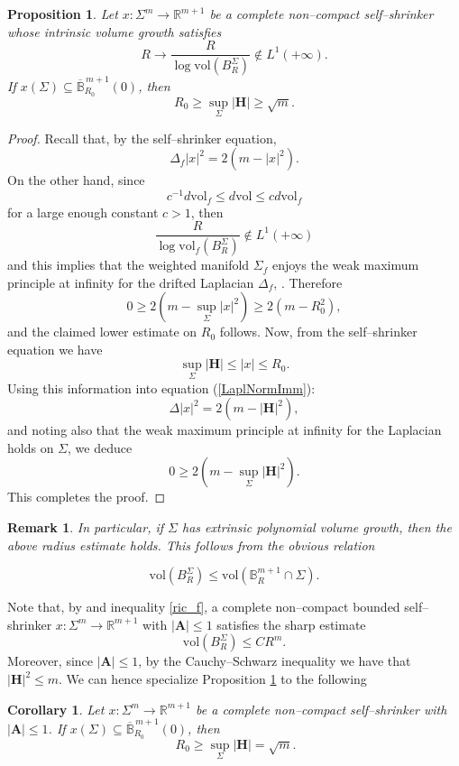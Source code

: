 \documentclass[11pt,leqno]{amsart}\usepackage{amsmath}
\newtheorem{corollary}[theorem]{Corollary}
\newtheorem{proposition}[theorem]{Proposition}
\newtheorem{remark}[theorem]{Remark}
\numberwithin{equation}{section}
\begin{document}
\begin{proposition}\label{PropBall}
Let $x\colon \Sigma^{m}\rightarrow\mathbb{R}^{m+1}$ be a complete non--compact self--shrinker
whose intrinsic volume growth satisfies
\[
R \to \frac{R}{\log\mathrm{vol}\left(B_{R}^{\Sigma}\right)} \not\in L^1(+\infty).
\]
If $x\left(  \Sigma\right)
\subseteq\overline{\mathbb{B}}_{R_{0}}^{\,m+1}\left(  0\right)$,
then\[
R_{0}\geq\sup_{\Sigma}\left\vert \mathbf{H}\right\vert \geq\sqrt{m}.
\]

\end{proposition}

\begin{proof}
Recall that, by the self--shrinker equation,\[
\Delta_{f}|x| ^{2}=2\left(  m-|x|^{2}\right)  .
\]
On the other hand, since
\[
c^{-1}d\mathrm{vol}_{f}\leq d\mathrm{vol}\leq cd\mathrm{vol}_{f}\]
for a large enough constant $c>1$, then
\[
\frac{R}{\log\mathrm{vol}_{f}\left(  B_{R}^{\Sigma}\right)} \not\in L^1(+\infty)
\]
and this implies that the weighted manifold $\Sigma_{f}$ enjoys the weak
maximum principle at infinity for the drifted Laplacian $\Delta_{f}$, \cite{PiRiSe-Memeoirs, PiRimSe-MathZ}.
Therefore\[
0\geq2\left(  m-\sup_{\Sigma}|x|^{2}\right)  \geq2\left(
m-R_{0}^{2}\right)  ,
\]
and the claimed lower estimate on $R_{0}$ follows. Now, from the self--shrinker
equation we have\[
\sup_{\Sigma}\left\vert \mathbf{H}\right\vert \leq|x|\leq
R_{0}.
\]
Using this information into equation (\ref{LaplNormImm}):
\begin{equation}\nonumber
\Delta|x|^{2}=2\left(  m-\left\vert \mathbf{H}\right\vert
^{2}\right)  ,
\end{equation}
and noting also that the weak maximum principle at infinity for the Laplacian
holds on $\Sigma$, we deduce\[
0\geq2\left(  m-\sup_{\Sigma}\left\vert \mathbf{H}\right\vert ^{2}\right)  .
\]
This completes the proof.
\end{proof}

\begin{remark}
\rm{In particular, if $\Sigma$ has extrinsic polynomial volume growth, then the above radius estimate holds. This follows from the obvious relation

\[
\mathrm{vol}(B^{\Sigma}_R)\leq \mathrm{vol}(\mathbb{B}^{m+1}_R \cap \Sigma).
\]}
\end{remark}

Note that, by \cite[Theorem 2.2]{Y} and inequality \eqref{ric_f}, a complete non--compact bounded self--shrinker $x:\Sigma^m\to\mathbb{R}^{m+1}$ with $|\mathbf{A}|\leq1$ satisfies the sharp estimate
\begin{equation}\label{IntrVolGrAleq1}
\mathrm{vol}(B_R^{\Sigma})\leq C R^m.
\end{equation}
Moreover, since $|\mathbf{A}|\leq1$, by the Cauchy--Schwarz inequality we have that $|\mathbf{H}|^2\leq m$.
We can hence specialize Proposition \ref{PropBall} to the following
\begin{corollary}\label{CoroBall}
Let $x:\Sigma^m\to\mathbb{R}^{m+1}$ be a complete non--compact self--shrinker with $|\mathbf{A}|\leq 1$. If $x(\Sigma)\subseteq \overline{\mathbb{B}}_{R_{0}}^{\,m+1}\left(  0\right)$, then
\[
\ R_{0}\geq\sup_{\Sigma}|\mathbf{H}|=\sqrt{m}.
\]
\end{corollary}
\end{document}
